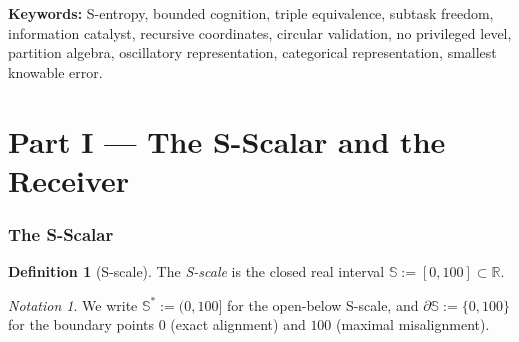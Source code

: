 \documentclass[twocolumn,11pt,a4paper]{article}
\theoremstyle{thmstyle}
\theoremstyle{thmstyle}
\theoremstyle{definition}
\newtheorem{definition}[theorem]{Definition}
\theoremstyle{remark}
\newtheorem{notation}[theorem]{Notation}
\newcommand{\Sscale}{\mathbb{S}}
\newcommand{\Real}{\mathbb{R}}
\begin{document}
\begin{abstract}
simultaneously as global problem and as subtask depending
on the embedding level. The framework is presented entirely
as pure mathematics; no physical or empirical claim
is required for its development. We discuss its formal
relations to ergodic theory, lattice theory, category
theory, and information theory. A complete numerical
validation suite of twenty independent experiments
verifies the principal theorems with maximum
discrepancy below $10^{-14}$ on identity statements
and within the predicted analytic bounds on
inequality statements; identity theorems are matched
to machine precision, multiplicity theorems are
saturated by direct enumeration, and convergence
theorems exhibit the predicted geometric rates.
\end{abstract}

\noindent\textbf{Keywords:} S-entropy, bounded cognition,
triple equivalence, subtask freedom, information catalyst,
recursive coordinates, circular validation, no privileged
level, partition algebra, oscillatory representation,
categorical representation, smallest knowable error.

\vspace{6pt}
\tableofcontents
\vspace{6pt}



\part*{Part I --- The S-Scalar and the Receiver}

\section{The S-Scalar}
\label{sec:s-scalar}

\begin{definition}[S-scale]\label{def:s-scale}
The \emph{S-scale} is the closed real interval
$\Sscale := [0, 100] \subset \Real$.
\end{definition}

\begin{notation}\label{not:s-scale}
We write $\Sscale^{*} := (0, 100]$ for the open-below
S-scale, and $\partial \Sscale := \{0, 100\}$ for the
boundary points $0$ (exact alignment) and $100$
(maximal misalignment).
\end{notation}
\end{document}
